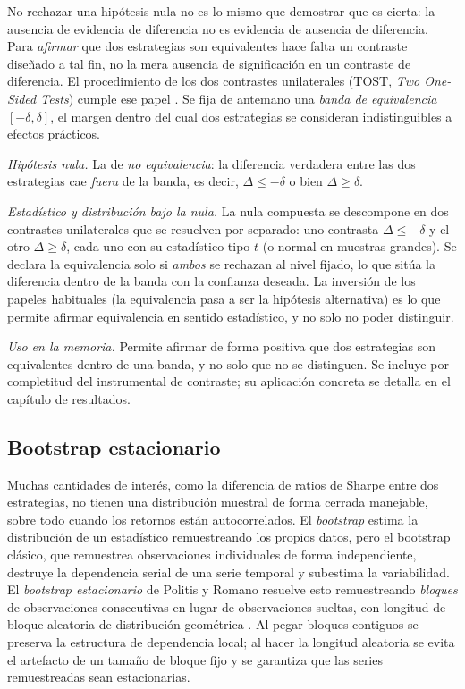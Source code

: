 No rechazar una hipótesis nula no es lo mismo que demostrar que es cierta: la ausencia de evidencia de diferencia no es evidencia de ausencia de diferencia. Para \emph{afirmar} que dos estrategias son equivalentes hace falta un contraste diseñado a tal fin, no la mera ausencia de significación en un contraste de diferencia. El procedimiento de los dos contrastes unilaterales (TOST, \emph{Two One-Sided Tests}) cumple ese papel \cite{schuirmann1987}. Se fija de antemano una \emph{banda de equivalencia} $[-\delta, \delta]$, el margen dentro del cual dos estrategias se consideran indistinguibles a efectos prácticos.

\emph{Hipótesis nula.} La de \emph{no equivalencia}: la diferencia verdadera entre las dos estrategias cae \emph{fuera} de la banda, es decir, $\Delta \le -\delta$ o bien $\Delta \ge \delta$.

\emph{Estadístico y distribución bajo la nula.} La nula compuesta se descompone en dos contrastes unilaterales que se resuelven por separado: uno contrasta $\Delta \le -\delta$ y el otro $\Delta \ge \delta$, cada uno con su estadístico tipo $t$ (o normal en muestras grandes). Se declara la equivalencia solo si \emph{ambos} se rechazan al nivel fijado, lo que sitúa la diferencia dentro de la banda con la confianza deseada. La inversión de los papeles habituales (la equivalencia pasa a ser la hipótesis alternativa) es lo que permite afirmar equivalencia en sentido estadístico, y no solo no poder distinguir.

\emph{Uso en la memoria.} Permite afirmar de forma positiva que dos estrategias son equivalentes dentro de una banda, y no solo que no se distinguen. Se incluye por completitud del instrumental de contraste; su aplicación concreta se detalla en el capítulo de resultados.

\subsection{Bootstrap estacionario}
\label{sec:tests-bootstrap}

Muchas cantidades de interés, como la diferencia de ratios de Sharpe entre dos estrategias, no tienen una distribución muestral de forma cerrada manejable, sobre todo cuando los retornos están autocorrelados. El \emph{bootstrap} estima la distribución de un estadístico remuestreando los propios datos, pero el bootstrap clásico, que remuestrea observaciones individuales de forma independiente, destruye la dependencia serial de una serie temporal y subestima la variabilidad. El \emph{bootstrap estacionario} de Politis y Romano resuelve esto remuestreando \emph{bloques} de observaciones consecutivas en lugar de observaciones sueltas, con longitud de bloque aleatoria de distribución geométrica \cite{politis1994}. Al pegar bloques contiguos se preserva la estructura de dependencia local; al hacer la longitud aleatoria se evita el artefacto de un tamaño de bloque fijo y se garantiza que las series remuestreadas sean estacionarias.

